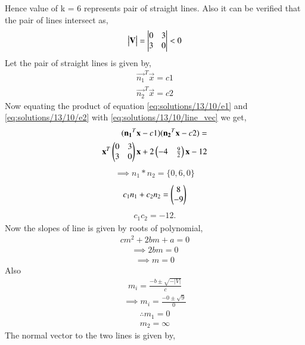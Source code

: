 Hence value of k = 6 represents pair of straight lines.
Also it can be verified that the pair of lines intersect as,
\begin{align}
\begin{vmatrix}\mathbf{V}\end{vmatrix} = \begin{vmatrix}0&3\\3&0\end{vmatrix} <0 
\end{align} 
Let the pair of straight lines is given by,
\begin{align}
\vec{n_1}^T\vec{x} = c1
\label{eq:solutions/13/10/e1}
\end{align}
\begin{align}
\vec{n_2}^T\vec{x} = c2
\label{eq:solutions/13/10/e2}
\end{align}
Now equating the product of equation \eqref{eq:solutions/13/10/e1} and \eqref{eq:solutions/13/10/e2} with \eqref{eq:solutions/13/10/line_vec} we get,
\begin{align}
(\mathbf{n_1}^T\mathbf{x} - c1)(\mathbf{n_2}^T\mathbf{x} - c2) = \\\mathbf{x}^T\begin{pmatrix}0&3\\3&0\end{pmatrix}\mathbf{x} + 2\begin{pmatrix}-4& \frac{9}{2}\end{pmatrix}\mathbf{x} - 12 
\end{align}
\begin{align}
\implies n_1 * n_2 = \{0,6,0\}
\label{eq:solutions/13/10/verify}
\end{align}
\begin{align}
c_1n_1+c_2n_2 = \begin{pmatrix}8\\-9\end{pmatrix}
\label{eq:solutions/13/10/sub1}
\end{align}
\begin{align}
c_1c_2 = -12.
\end{align}
Now the slopes of line is given by roots of polynomial,
\begin{align}
cm^2 + 2bm + a = 0
\end{align} 
\begin{align}
\implies 2bm = 0
\end{align}
\begin{align}
\implies m = 0
\end{align}
Also
\begin{align}
m_i = \frac{-b\pm\sqrt{-|V|}}{c} 
\end{align}
\begin{align}
\implies m_i = \frac{-0\pm\sqrt{9}}{0} 
\end{align}
\begin{align}
\therefore m_1 = 0
\end{align}
\begin{align}
 m_2 = \infty
\end{align}
The normal vector to the two lines is given by,
